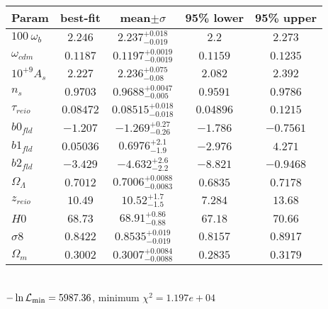 \begin{tabular}{|l|c|c|c|c|} 
 \hline 
Param & best-fit & mean$\pm\sigma$ & 95\% lower & 95\% upper \\ \hline 
$100~\omega_{b }$ &$2.246$ & $2.237_{-0.019}^{+0.018}$ & $2.2$ & $2.273$ \\ 
$\omega_{cdm }$ &$0.1187$ & $0.1197_{-0.0019}^{+0.0019}$ & $0.1159$ & $0.1235$ \\ 
$10^{+9}A_{s }$ &$2.227$ & $2.236_{-0.08}^{+0.075}$ & $2.082$ & $2.392$ \\ 
$n_{s }$ &$0.9703$ & $0.9688_{-0.005}^{+0.0047}$ & $0.9591$ & $0.9786$ \\ 
$\tau_{reio }$ &$0.08472$ & $0.08515_{-0.018}^{+0.018}$ & $0.04896$ & $0.1215$ \\ 
$b0_{fld }$ &$-1.207$ & $-1.269_{-0.26}^{+0.27}$ & $-1.786$ & $-0.7561$ \\ 
$b1_{fld }$ &$0.05036$ & $0.6976_{-1.9}^{+2.1}$ & $-2.976$ & $4.271$ \\ 
$b2_{fld }$ &$-3.429$ & $-4.632_{-2.2}^{+2.6}$ & $-8.821$ & $-0.9468$ \\ 
$\Omega_{\Lambda }$ &$0.7012$ & $0.7006_{-0.0083}^{+0.0088}$ & $0.6835$ & $0.7178$ \\ 
$z_{reio }$ &$10.49$ & $10.52_{-1.5}^{+1.7}$ & $7.284$ & $13.68$ \\ 
$H0$ &$68.73$ & $68.91_{-0.88}^{+0.86}$ & $67.18$ & $70.66$ \\ 
$\sigma8$ &$0.8422$ & $0.8535_{-0.019}^{+0.019}$ & $0.8157$ & $0.8917$ \\ 
$\Omega_{m }$ &$0.3002$ & $0.3007_{-0.0088}^{+0.0084}$ & $0.2835$ & $0.3179$ \\ 
\hline 
 \end{tabular} \\ 
$-\ln{\cal L}_\mathrm{min} =5987.36$, minimum $\chi^2=1.197e+04$ \\ 
